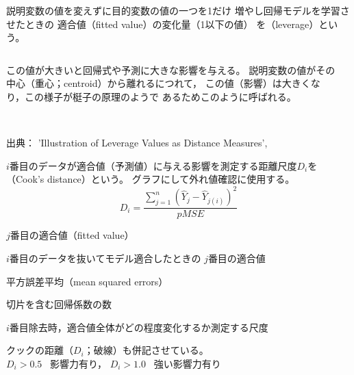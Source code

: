 \MyFrame{}
{
  {
    説明変数の値を変えずに目的変数の値の一つを1だけ
    増やし回帰モデルを学習させたときの
    適合値（fitted value）の変化量（1以下の値）
    を（leverage）という。
  }
  \begin{columns}
    \begin{column}{0.5\textwidth}
      この値が大きいと回帰式や予測に大きな影響を与える。
      説明変数の値がその中心（重心；centroid）から離れるにつれて，
      この値（影響）は大きくなり，この様子が梃子の原理のようで
      あるためこのように呼ばれる。
    \end{column}
    \begin{column}{0.5\textwidth}
    \end{column}
  \end{columns}\mbox{}\\
  \tiny
  出典：
  'Illustration of Leverage Values as Distance Measures',
}

\MyFrame{}
{
  {
    $i$番目のデータが適合値（予測値）に与える影響を測定する距離尺度$D_i$を
    （Cook's distance）という。
    グラフにして外れ値確認に使用する。
    \[
      D_i = \frac{\sum_{j=1}^n(\hat{Y}_j-\hat{Y}_{j(i)})^2}{pMSE}
    \]
    \vspace{-20mm}
    \MyItems
    {
      \item [$\hat{Y}_j$] $j$番目の適合値（fitted value）
      \item [$\hat{Y}_{j(i)}$] $i$番目のデータを抜いてモデル適合したときの
        $j$番目の適合値
      \item [MSE] 平方誤差平均（mean squared errors）
      \item [$p$] 切片を含む回帰係数の数
    }
  }
  $i$番目除去時，適合値全体がどの程度変化するか測定する尺度
}

{
  クックの距離（$D_i$；破線）も併記させている。\\
  $D_i > 0.5$ \ra ~影響力有り，
  $D_i > 1.0$ \ra ~強い影響力有り
}

